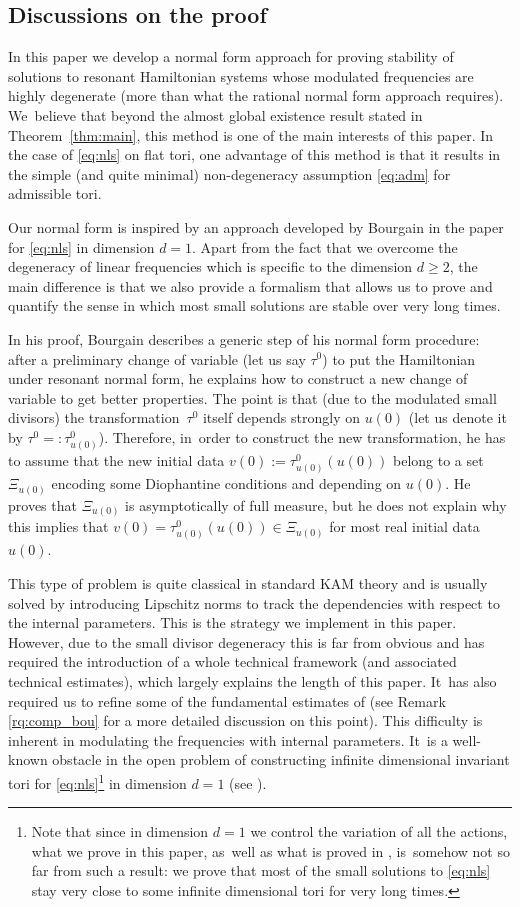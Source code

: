 \documentclass[JEP,XML,SOM,Unicode,published]{cedram}
\theoremstyle{plain}
\theoremstyle{definition}
\newcommand{\1}{\mathbf{1}}
\begin{document}
\subsection{Discussions on the proof} In this paper we develop a normal form approach for proving stability of solutions to resonant Hamiltonian systems whose modulated frequencies are highly degenerate (more than what the rational normal form approach requires). We~believe that beyond the almost global existence result stated in Theorem~\ref{thm:main}, this method is one of the main interests of this paper. In the case of \eqref{eq:nls} on flat tori, one advantage of this method is that it results in the simple (and quite minimal) non-degeneracy assumption \eqref{eq:adm} for admissible tori.

Our normal form is inspired by an approach developed by Bourgain in the paper \cite{Bou00} for \eqref{eq:nls} in dimension $d=1$. Apart from the fact that we overcome the degeneracy of linear frequencies which is specific to the dimension $d\geq 2$, the main difference is that we also provide a formalism that allows us to prove and quantify the sense in which most small solutions are stable over very long times.

In his proof, Bourgain describes a generic step of his normal form procedure: after a preliminary change of variable (let us say $\tau^0$) to put the Hamiltonian under resonant normal form, he explains how to construct a new change of variable to get better properties. The point is that (due to the modulated small divisors) the transformation~$\tau^0$ itself depends strongly on $u(0)$ (let us denote it by $\tau^0 =: \tau^0_{u(0)}$). Therefore, in~order to construct the new transformation, he has to assume that the new initial data $v(0):= \tau^0_{u(0)}(u(0))$ belong to a set $\Xi_{u(0)}$ encoding some Diophantine conditions and depending on $u(0)$. He proves that $\Xi_{u(0)}$ is asymptotically of full measure, but he does not explain why this implies that $v(0)=\tau^0_{u(0)}(u(0))\in \Xi_{u(0)}$ for most real initial data $u(0)$.

This type of problem is quite classical in standard KAM theory and is usually solved by introducing Lipschitz norms to track the dependencies with respect to the internal parameters. This is the strategy we implement in this paper. However, due to the small divisor degeneracy this is far from obvious and has required the introduction of a whole technical framework (and associated technical estimates), which largely explains the length of this paper. It~has also required us to refine some of the fundamental estimates of \cite{Bou00} (see \eg Remark \ref{rq:comp_bou} for a more detailed discussion on this point). This difficulty is inherent in modulating the frequencies with internal parameters. It~is a well-known obstacle in the open problem of constructing infinite dimensional invariant tori for \eqref{eq:nls}\footnote{Note that since in dimension $d=1$ we control the variation of all the actions, what we prove in this paper, as~well as what is proved in \cite{Bou00,KillBill}, is~somehow not so far from such a result: we prove that most of the small solutions to \eqref{eq:nls} stay very close to some infinite dimensional tori for very long times.} in dimension $d=1$ (see \eg \cite{Pos}).
\end{document}
